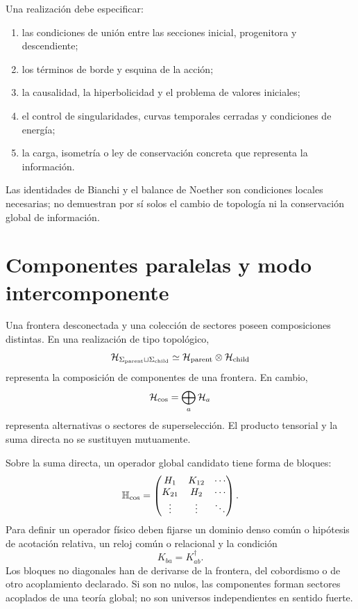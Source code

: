 Una realización debe especificar:
\begin{enumerate}
 \item las condiciones de unión entre las secciones inicial, progenitora y
 descendiente;
 \item los términos de borde y esquina de la acción;
 \item la causalidad, la hiperbolicidad y el problema de valores iniciales;
 \item el control de singularidades, curvas temporales cerradas y condiciones
 de energía;
 \item la carga, isometría o ley de conservación concreta que representa la
 información.
\end{enumerate}
Las identidades de Bianchi y el balance de Noether son condiciones locales
necesarias; no demuestran por sí solos el cambio de topología ni la
conservación global de información.

\section{Componentes paralelas y modo intercomponente}
\label{sec:componentes-cosmologicas-paralelas}

Una frontera desconectada y una colección de sectores poseen composiciones
distintas. En una realización de tipo topológico,
\[
 \mathcal H_{\Sigma_{\rm parent}\sqcup\Sigma_{\rm child}}
 \simeq
 \mathcal H_{\rm parent}\otimes\mathcal H_{\rm child}
\]
representa la composición de componentes de una frontera. En cambio,
\[
 \mathcal H_{\rm cos}
 =\bigoplus_a\mathcal H_a
\]
representa alternativas o sectores de superselección. El producto tensorial
y la suma directa no se sustituyen mutuamente.

Sobre la suma directa, un operador global candidato tiene forma de bloques:
\[
 \mathbb H_{\rm cos}
 =
 \begin{pmatrix}
 H_1&K_{12}&\cdots\\
 K_{21}&H_2&\cdots\\
 \vdots&\vdots&\ddots
 \end{pmatrix}.
\]
Para definir un operador físico deben fijarse un dominio denso común o
hipótesis de acotación relativa, un reloj común o relacional y la condición
\[
 K_{ba}=K_{ab}^{\dagger}.
\]
Los bloques no diagonales han de derivarse de la frontera, del cobordismo o
de otro acoplamiento declarado. Si son no nulos, las componentes forman
sectores acoplados de una teoría global; no son universos independientes en
sentido fuerte.

